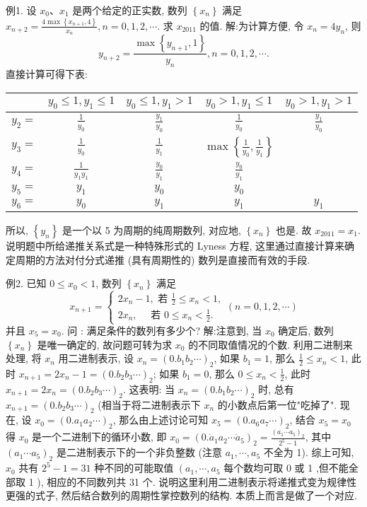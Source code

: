 例1. 设 $x_0 、 x_1$ 是两个给定的正实数, 数列 $\left\{x_n\right\}$ 满足 $x_{n+2}= \frac{4 \max \left\{x_{n+1}, 4\right\}}{x_n}, n=0,1,2, \cdots$. 求 $x_{2011}$ 的值.
解:为计算方便, 令 $x_n=4 y_n$, 则
$$
y_{n+2}=\frac{\max \left\{y_{n+1}, 1\right\}}{y_n}, n=0,1,2, \cdots .
$$
直接计算可得下表:
\begin{tabular}{|c|c|c|c|c|}
\hline & $y_0 \leqslant 1, y_1 \leqslant 1$ & $y_0 \leqslant 1, y_1>1$ & $y_0>1, y_1 \leqslant 1$ & $y_0>1, y_1>1$ \\
\hline$y_2=$ & $\frac{1}{y_0}$ & $\frac{y_1}{y_0}$ & $\frac{1}{y_0}$ & $\frac{y_1}{y_0}$ \\
$y_3=$ & $\frac{1}{y_0}$ & $\frac{1}{y_1}$ & $\max \left\{\frac{1}{y_0}, \frac{1}{y_1}\right\}$ \\
$y_4=$ & $\frac{1}{y_1 y_1}$ & $\frac{y_0}{y_1}$ & $\frac{y_0}{y_1}$ \\
$y_5=$ & $y_1$ & $y_0$ & $y_0$ \\
$y_6=$ & $y_0$ & $y_1$ & $y_1$ & $y_1$ \\
\hline
\end{tabular}
所以, $\left\{y_n\right\}$ 是一个以 5 为周期的纯周期数列, 对应地, $\left\{x_n\right\}$ 也是.
故 $x_{2011}=x_1$.
说明题中所给递推关系式是一种特殊形式的 Lyness 方程, 这里通过直接计算来确定周期的方法对付分式递推 (具有周期性的) 数列是直接而有效的手段.



例2. 已知 $0 \leqslant x_0<1$, 数列 $\left\{x_n\right\}$ 满足
$$
x_{n+1}=\left\{\begin{array}{l}
2 x_n-1, \text { 若 } \frac{1}{2} \leqslant x_n<1, \\
2 x_n, \quad \text { 若 } 0 \leqslant x_n<\frac{1}{2} .
\end{array}(n=0,1,2, \cdots)\right.
$$
并且 $x_5=x_0$. 问 : 满足条件的数列有多少个?
解:注意到, 当 $x_0$ 确定后, 数列 $\left\{x_n\right\}$ 是唯一确定的, 故问题可转为求 $x_0$ 的不同取值情况的个数.
利用二进制来处理, 将 $x_n$ 用二进制表示, 设 $x_n=\left(0 . b_1 b_2 \cdots\right)_2$, 如果 $b_1=1$, 那么 $\frac{1}{2} \leqslant x_n<1$, 此时 $x_{n+1}=2 x_n-1=\left(0 . b_2 b_3 \cdots\right)_2$; 如果 $b_1=0$, 那么 $0 \leqslant x_n<\frac{1}{2}$, 此时 $x_{n+1}=2 x_n=\left(0 . b_2 b_3 \cdots\right)_2$. 这表明: 当 $x_n=\left(0 . b_1 b_2 \cdots\right)_2$ 时, 总有 $x_{n+1}=\left(0 . b_2 b_3 \cdots\right)_2$ (相当于将二进制表示下 $x_n$ 的小数点后第一位"吃掉了".
现在, 设 $x_0=\left(0 . a_1 a_2 \cdots\right)_2$, 那么由上述讨论可知 $x_5=\left(0 . a_6 a_7 \cdots\right)_2$, 结合 $x_5=x_0$ 得 $x_0$ 是一个二进制下的循环小数, 即 $x_0=\left(0 . \dot{a}_1 a_2 \cdots \dot{a}_5\right)_2= \frac{\left(a_1 \cdots a_5\right)_2}{2^5-1}$, 其中 $\left(a_1 \cdots a_5\right)_2$ 是二进制表示下的一个非负整数 (注意 $a_1, \cdots, a_5$ 不全为 1).
综上可知, $x_0$ 共有 $2^5-1=31$ 种不同的可能取值 $\left(a_1, \cdots, a_5\right.$ 每个数均可取 0 或 1 ,但不能全部取 1 ), 相应的不同数列共 31 个.
说明这里利用二进制表示将递推式变为规律性更强的式子, 然后结合数列的周期性掌控数列的结构.
本质上而言是做了一个对应.



